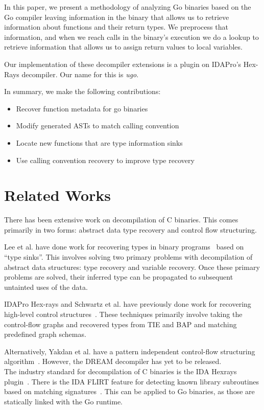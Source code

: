 \documentclass[letterpaper,twocolumn,10pt]{article}
\begin{document}
In this paper, we present a methodology of analyzing Go binaries based on the Go compiler leaving information in the binary that allows us to retrieve information about functions and their return types. We preprocess that information, and when we reach calls in the binary’s execution we do a lookup to retrieve information that allows us to assign return values to local variables.

Our implementation of these decompiler extensions is a plugin on IDAPro’s Hex-Rays decompiler. Our name for this is \textit{ugo}.

In summary, we make the following contributions:
\begin{itemize}
\item Recover function metadata for go binaries
\item Modify generated ASTs to match calling convention
\item Locate new functions that are type information sinks
\item Use calling convention recovery to improve type recovery
\end{itemize}


\section{Related Works}
There has been extensive work on decompilation of C binaries. This comes primarily in two forms: abstract data type recovery and control flow structuring. 

Lee et al. have done work for recovering types in binary programs~\cite{tie} based on “type sinks”. This involves solving two primary problems with decompilation of abstract data structures: type recovery and variable recovery. Once these primary problems are solved, their inferred type can be propagated to subsequent untainted uses of the data. 

IDAPro Hex-rays and Schwartz et al. have previously done work for recovering high-level control structures~\cite{schwartz}. These techniques primarily involve taking the control-flow graphs and recovered types from TIE and BAP and matching predefined graph schemas. 

Alternatively, Yakdan et al. have a pattern independent control-flow structuring algorithm~\cite{dream}. However, the DREAM decompiler has yet to be released.\\
The industry standard for decompilation of C binaries is the IDA Hexrays plugin~\cite{idaprobook}. There is the IDA FLIRT feature for detecting known library subroutines based on matching signatures~\cite{flirt}. This can be applied to Go binaries, as those are statically linked with the Go runtime.
\end{document}
